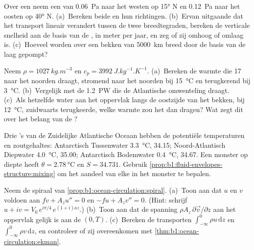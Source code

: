 \begin{exercise}[$\star\star$]\label{exo:b1:ocean-circulation:7}
Over een  neem een  van \qty{0.06}{Pa} naar het westen op
\ang{15} N en \qty{0.12}{Pa} naar het oosten op \ang{40} N. (a)~Bereken beide  en hun richtingen. (b)~Ervan uitgaande dat het transport lineair verandert tussen de twee breedtegraden, bereken de verticale snelheid aan de basis van de , in meter per jaar, en zeg of zij omhoog of omlaag is. (c)~Hoeveel  worden over een bekken van \qty{5000}{km} breed door de basis van de laag gepompt?
\end{exercise}

\begin{exercise}[$\star\star$]\label{exo:b1:ocean-circulation:8}
Neem $\rho = \qty{1027}{kg.m^{-3}}$ en $c_p = \qty{3992}{J.kg^{-1}.K^{-1}}$.
(a)~Bereken de warmte die \qty{17}{\sverdrup} naar het noorden draagt, stromend naar het noorden bij
\qty{15}{\celsius} en terugkerend bij \qty{3}{\celsius}. (b)~Vergelijk met de \qty{1.2}{PW} die de Atlantische omwenteling draagt. (c)~Als hetzelfde water aan het oppervlak langs de oostzijde van het bekken, bij \qty{12}{\celsius}, zuidwaarts terugkeerde, welke warmte zou het dan dragen? Wat zegt dit over het belang van de ?
\end{exercise}

\begin{exercise}[$\star\star$]\label{exo:b1:ocean-circulation:9}
Drie 's van de Zuidelijke Atlantische Oceaan hebben de potentiële temperaturen en zoutgehaltes: Antarctisch Tussenwater \qty{3.3}{\celsius}, 34.15; Noord-Atlantisch Diepwater \qty{4.0}{\celsius}, 35.00; Antarctisch Bodemwater \qty{0.4}{\celsius},
34.67. Een monster op diepte heeft $\theta = \qty{2.78}{\celsius}$ en $S = 34.731$.
Gebruik \cref{prop:b1:fluid-envelopes-structure:mixing} om het aandeel van elke  in het monster te bepalen.
\end{exercise}

\begin{exercise}[$\star\star\star$]\label{exo:b1:ocean-circulation:10}
Neem de spiraal van \cref{prop:b1:ocean-circulation:spiral}. (a)~Toon aan dat $u$ en $v$ voldoen aan $f v + A_z u'' = 0$ en $-f u + A_z v'' = 0$. (Hint: schrijf $u + iv =
V_0\,e^{i\pi/4}\,e^{(1+i)az}$.) (b)~Toon aan dat de spanning $\rho A_z\,\partial\vec
v/\partial z$ aan het oppervlak gelijk is aan de  $(0, T)$. (c)~Bereken de
transporten $\int_{-\infty}^0 \rho u\,\mathrm dz$ en $\int_{-\infty}^0 \rho
v\,\mathrm dz$, en controleer of zij overeenkomen met
\cref{thm:b1:ocean-circulation:ekman}.
\end{exercise}

